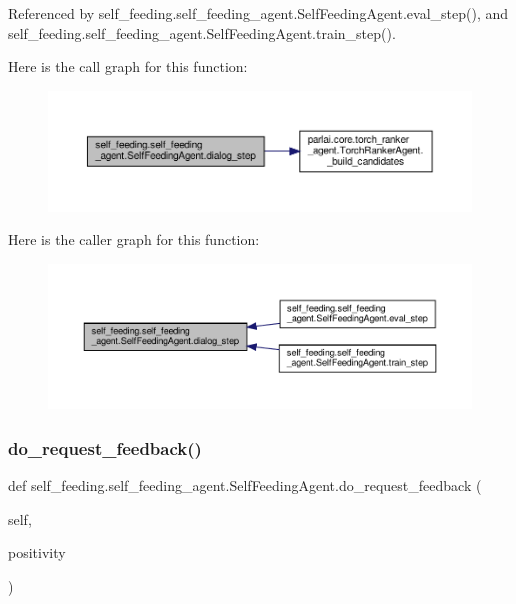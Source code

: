 Referenced by self\+\_\+feeding.\+self\+\_\+feeding\+\_\+agent.\+Self\+Feeding\+Agent.\+eval\+\_\+step(), and self\+\_\+feeding.\+self\+\_\+feeding\+\_\+agent.\+Self\+Feeding\+Agent.\+train\+\_\+step().

Here is the call graph for this function\+:
\nopagebreak
\begin{figure}[H]
\begin{center}
\leavevmode
\includegraphics[width=350pt]{classself__feeding_1_1self__feeding__agent_1_1SelfFeedingAgent_a761c50309d11237b261a3600923964c9_cgraph}
\end{center}
\end{figure}
Here is the caller graph for this function\+:
\nopagebreak
\begin{figure}[H]
\begin{center}
\leavevmode
\includegraphics[width=350pt]{classself__feeding_1_1self__feeding__agent_1_1SelfFeedingAgent_a761c50309d11237b261a3600923964c9_icgraph}
\end{center}
\end{figure}
\mbox{\label{classself__feeding_1_1self__feeding__agent_1_1SelfFeedingAgent_a6d28a8c3f063bde4cd98cfb209821bf5}} 
\subsubsection{\texorpdfstring{do\+\_\+request\+\_\+feedback()}{do\_request\_feedback()}}
{\footnotesize\ttfamily def self\+\_\+feeding.\+self\+\_\+feeding\+\_\+agent.\+Self\+Feeding\+Agent.\+do\+\_\+request\+\_\+feedback (\begin{DoxyParamCaption}\item[{}]{self,  }\item[{}]{positivity }\end{DoxyParamCaption})}

